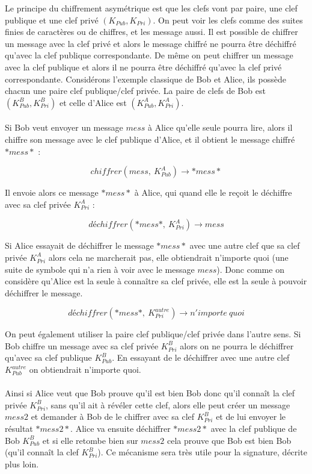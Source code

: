 \documentclass[11pt,a4paper]{article}
\begin{document}
Le principe du chiffrement asymétrique est que les clefs vont par paire, une clef publique et une clef privé $(K_{Pub}, K_{Pri})$. On peut voir les clefs comme des suites finies de caractères ou de chiffres, et les message aussi. Il est possible de chiffrer un message avec la clef privé et alors le message chiffré ne pourra être déchiffré qu'avec la clef publique correspondante. De même on peut chiffrer un message avec la clef publique et alors il ne pourra être déchiffré qu'avec la clef privé correspondante. Considérons l'exemple classique de Bob et Alice, ils possède chacun une paire clef publique/clef privée. La paire de clefs de Bob est 
$(K_{Pub}^{B}, K_{Pri}^{B})$ et celle d'Alice est $(K_{Pub}^{A}, K_{Pri}^{A})$.\\\\

Si Bob veut envoyer un message $mess$ à Alice qu'elle seule pourra lire, alors il chiffre son message avec le clef publique d'Alice, et il obtient le message chiffré $*mess*$ :

$$chiffrer(mess, ~K_{Pub}^{A}) \rightarrow *mess*$$

Il envoie alors ce message $*mess*$ à Alice, qui quand elle le reçoit le déchiffre avec sa clef privée $K_{Pri}^{A}$ :

$$déchiffrer(*mess*, ~K_{Pri}^{A}) \rightarrow mess$$

Si Alice essayait de déchiffrer le message $*mess*$ avec une autre clef que sa clef privée $K_{Pri}^{A}$ alors cela ne marcherait pas, elle obtiendrait n'importe quoi (une suite de symbole qui n'a rien à voir avec le message $mess$). Donc comme on considère qu'Alice est la seule à connaître sa clef privée, elle est la seule à pouvoir déchiffrer le message.

$$déchiffrer(*mess*, ~K_{Pri}^{autre}) \rightarrow n'importe~quoi$$

On peut également utiliser la paire clef publique/clef privée dans l'autre sens. Si Bob chiffre un message avec sa clef privée $K_{Pri}^{B}$ alors on ne pourra le déchiffrer qu'avec sa clef publique $K_{Pub}^{B}$. En essayant de le déchiffrer avec une autre clef $K_{Pub}^{autre}$ on obtiendrait n'importe quoi.\\\\ Ainsi si Alice veut que Bob prouve qu'il est bien Bob donc qu'il connaît la clef privée $K_{Pri}^{B}$, sans qu'il ait à révéler cette clef, alors elle peut créer un message $mess2$ et demander à Bob de le chiffrer avec sa clef $K_{Pri}^{B}$ et de lui envoyer le résultat $*mess2*$. Alice va ensuite déchiffrer $*mess2*$ avec la clef publique de Bob $K_{Pub}^{B}$ et si elle retombe bien sur $mess2$ cela prouve que Bob est bien Bob (qu'il connaît la clef $K_{Pri}^{B}$). Ce mécanisme sera très utile pour la signature, décrite plus loin.
\end{document}
